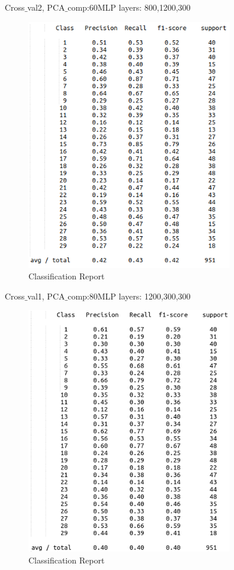 \documentclass[12pt]{report}
\begin{document}
Cross$\_$val2, PCA$\_$comp:60MLP layers: 800,1200,300  

\begin{figure}[H]
  \centering
  \includegraphics[width=0.8\textwidth]{Images/nn2.png}
  \caption{Classification Report}
\end{figure}

\newpage
Cross$\_$val1, PCA$\_$comp:80MLP layers: 1200,300,300   

\begin{figure}[H]
  \centering
  \includegraphics[width=0.8\textwidth]{Images/nn3.png}
  \caption{Classification Report}
\end{figure}
\end{document}
